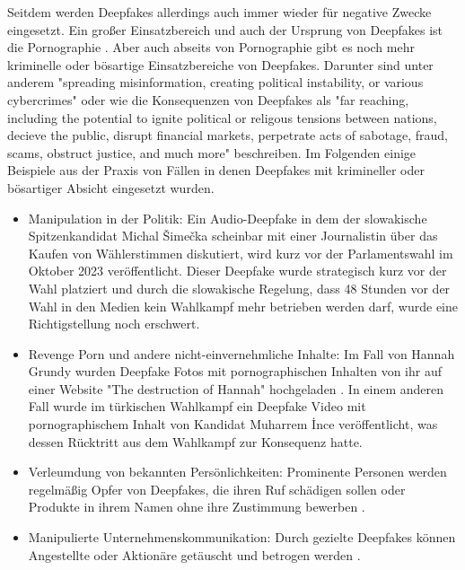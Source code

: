 Seitdem werden Deepfakes allerdings auch immer wieder für negative Zwecke eingesetzt. 
Ein großer Einsatzbereich und auch der Ursprung von Deepfakes ist die Pornographie \autocite{ajderDeeptraceLabReport}. 
Aber auch abseits von Pornographie gibt es noch mehr kriminelle oder bösartige Einsatzbereiche von Deepfakes. 
Darunter sind unter anderem "spreading misinformation, creating political instability, or various cybercrimes" \cite{ranaDeepfakeDetectionSystematic2022} 
oder wie \textcite{gambinDeepfakesCurrentFuture2024} die Konsequenzen von Deepfakes als "far reaching, including the potential to ignite political or religous tensions between nations, decieve the public, disrupt financial markets, perpetrate acts of sabotage, fraud, scams, obstruct justice, and much more" beschreiben.
Im Folgenden einige Beispiele aus der Praxis von Fällen in denen Deepfakes mit krimineller oder bösartiger Absicht eingesetzt wurden.
\begin{itemize}
    \item Manipulation in der Politik: Ein Audio-Deepfake in dem der slowakische Spitzenkandidat Michal Šimečka scheinbar mit einer 
        Journalistin über das Kaufen von Wählerstimmen diskutiert, wird kurz vor der Parlamentswahl im Oktober 2023 veröffentlicht. 
        Dieser Deepfake wurde strategisch kurz vor der Wahl platziert und durch die slowakische Regelung, 
        dass 48 Stunden vor der Wahl in den Medien kein Wahlkampf mehr betrieben werden darf, wurde eine Richtigstellung noch erschwert. \autocite{pawelecPolitischeManipulationUnd2024}
    \item Revenge Porn und andere nicht-einvernehmliche Inhalte: 
        Im Fall von Hannah Grundy wurden Deepfake Fotos mit pornographischen Inhalten von ihr auf einer Website "The destruction of Hannah" hochgeladen \autocite{WomansDeepfakeBetrayal2025}.
        In einem anderen Fall wurde im türkischen Wahlkampf ein Deepfake Video mit pornographischem Inhalt von Kandidat Muharrem İnce veröffentlicht, 
        was dessen Rücktritt aus dem Wahlkampf zur Konsequenz hatte. \autocite{TurkishPresidentialCandidate2023}
    \item Verleumdung von bekannten Persönlichkeiten: Prominente Personen werden regelmäßig Opfer von Deepfakes, 
        die ihren Ruf schädigen sollen oder Produkte in ihrem Namen ohne ihre Zustimmung bewerben \autocite{PDFImpactDeepfake2025}.
    \item Manipulierte Unternehmenskommunikation: Durch gezielte Deepfakes können Angestellte oder Aktionäre getäuscht und betrogen werden \autocite{PDFImpactDeepfake2025}.
\end{itemize}
